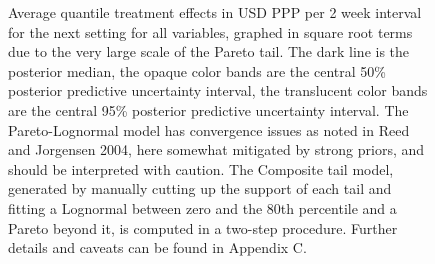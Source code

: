 \documentclass[AER]{AEA}
\begin{document}
\begin{figure}[h!]
  \caption{ \small Average quantile treatment effects in USD PPP per 2 week interval for the next setting for all variables, graphed in square root terms due to the very large scale of the Pareto tail. The dark line is the posterior median, the opaque color bands are the central 50\% posterior predictive uncertainty interval, the translucent color bands are the central 95\% posterior predictive uncertainty interval. The Pareto-Lognormal model has convergence issues as noted in Reed and Jorgensen 2004, here somewhat mitigated by strong priors, and should be interpreted with caution. The Composite tail model, generated by manually cutting up the support of each tail and fitting a Lognormal between zero and the 80th percentile and a Pareto beyond it, is computed in a two-step procedure. Further details and caveats can be found in Appendix C.} \label{complex quantiles}
\end{figure}

\clearpage









\end{document}
